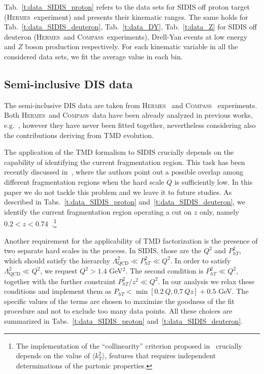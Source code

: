 \documentclass[aps,preprintnumbers,showpacs,nofootinbib,superscriptaddress,floatfix]{revtex4}
\newcommand{\hermes}{\textsc{Hermes}}
\newcommand{\compass}{\textsc{Compass}}
\begin{document}
Tab.~\ref{t:data_SIDIS_proton} refers to the data sets for SIDIS off proton target (\hermes\ experiment) and presents their kinematic ranges. 
The same holds for Tab.~\ref{t:data_SIDIS_deuteron}, Tab.~\ref{t:data_DY}, Tab.~\ref{t:data_Z} for SIDIS off deuteron (\hermes\ and \compass\ experiments), Drell-Yan events at low energy and $Z$ boson production respectively. 
For each kinematic variable in all the considered data sets, we fit the average value in each bin.
 
\subsection{Semi-inclusive DIS data}
\label{ss:SIDIS data}

The semi-inclusive DIS data are taken from \hermes~\cite{Airapetian:2012ki} and \compass~\cite{Adolph:2013stb} experiments. 
Both \hermes\ and \compass\ data have been already analyzed in previous works, e.g.~\cite{Signori:2013mda,Anselmino:2013lza}, however they have never been fitted together, nevertheless considering also the contributions deriving from TMD evolution.

The application of the TMD formalism to SIDIS crucially depends on the capability of identifying the current fragmentation region. This task has been recently discussed in~\cite{Boglione:2016bph}, where the authors point out a possible overlap among different  fragmentation regions when the hard scale $Q$ is sufficiently low. 
In this paper we do not tackle this problem and we leave it to future studies. As described in Tabs.~\ref{t:data_SIDIS_proton} and~\ref{t:data_SIDIS_deuteron}, we identify the current fragmentation region operating a cut on $z$ only, namely $0.2 < z < 0.74$\ .\footnote{The implementation of the ``collinearity'' criterion proposed in~\cite{Boglione:2016bph} crucially depends on the value of $\langle k_T^2 \rangle$, features that requires independent determinations of the partonic properties.}

Another requirement for the applicability of TMD factorization is the presence of two separate hard scales in the process. In SIDIS, those are the $Q^2$ and $P_{hT}^2$, which should satisfy the hierarchy $\Lambda_{\text{QCD}}^2 \ll P_{hT}^2 \ll Q^2$. 
In order to satisfy $\Lambda_{\text{QCD}}^2 \ll Q^2$, we request $Q^2 > 1.4$ GeV$^2$. 
The second condition is $P_{hT}^2 \ll Q^2$, together with the further constraint  $P_{hT}^2/z^2 \ll Q^2$. In our analysis we relax
these conditions and implement them as $P_{hT} < \min[0.2\ Q, 0.7\ Qz] + 0.5$ GeV. The specific values of the terms are chosen to maximize the goodness of the fit procedure and not to exclude too many data points.
All these choices are summarized in Tabs.~\ref{t:data_SIDIS_proton} and~\ref{t:data_SIDIS_deuteron}.
\end{document}
